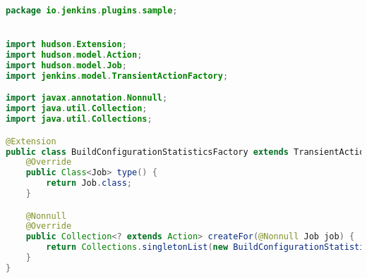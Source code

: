 \begin{lstlisting}[language=Java]
package io.jenkins.plugins.sample;


import hudson.Extension;
import hudson.model.Action;
import hudson.model.Job;
import jenkins.model.TransientActionFactory;

import javax.annotation.Nonnull;
import java.util.Collection;
import java.util.Collections;

@Extension
public class BuildConfigurationStatisticsFactory extends TransientActionFactory<Job> {
    @Override
    public Class<Job> type() {
        return Job.class;
    }

    @Nonnull
    @Override
    public Collection<? extends Action> createFor(@Nonnull Job job) {
        return Collections.singletonList(new BuildConfigurationStatisticsAction(job));
    }
}
\end{lstlisting}


